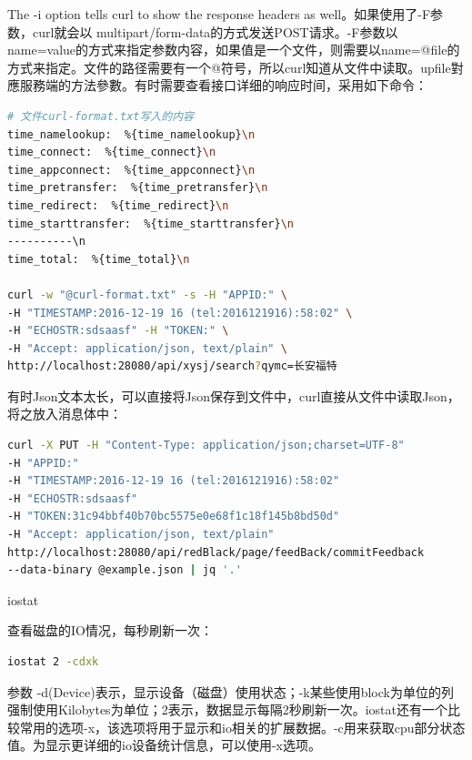 \documentclass[12pt]{book}
\makeatletter
\numberwithin{dummy}{section}
\theoremstyle{ocrenumbox}
\theoremstyle{blacknumex}
\theoremstyle{blacknumbox}
\theoremstyle{ocrenum}
\renewcommand{\subsection}{\@startsection {subsection}{2}{\z@}
	{-3ex \@plus -0.1ex \@minus -.4ex}
	{0.5ex \@plus.2ex }
	{\normalfont\sffamily\bfseries}}
\newlength\esp
\makeatother
\begin{document}
The -i option tells curl to show the response headers as well。如果使用了-F参数，curl就会以 multipart/form-data的方式发送POST请求。-F参数以name=value的方式来指定参数内容，如果值是一个文件，则需要以name=@file的方式来指定。文件的路径需要有一个@符号，所以curl知道从文件中读取。upfile對應服務端的方法參數。有时需要查看接口详细的响应时间，采用如下命令：

\begin{lstlisting}[language=Bash]
# 文件curl-format.txt写入的内容
time_namelookup:  %{time_namelookup}\n
time_connect:  %{time_connect}\n
time_appconnect:  %{time_appconnect}\n
time_pretransfer:  %{time_pretransfer}\n
time_redirect:  %{time_redirect}\n
time_starttransfer:  %{time_starttransfer}\n
----------\n
time_total:  %{time_total}\n

curl -w "@curl-format.txt" -s -H "APPID:" \
-H "TIMESTAMP:2016-12-19 16 (tel:2016121916):58:02" \
-H "ECHOSTR:sdsaasf" -H "TOKEN:" \
-H "Accept: application/json, text/plain" \
http://localhost:28080/api/xysj/search?qymc=长安福特
\end{lstlisting}

有时Json文本太长，可以直接将Json保存到文件中，curl直接从文件中读取Json，将之放入消息体中：

\begin{lstlisting}[language=Bash]
curl -X PUT -H "Content-Type: application/json;charset=UTF-8" 
-H "APPID:"  
-H "TIMESTAMP:2016-12-19 16 (tel:2016121916):58:02"  
-H "ECHOSTR:sdsaasf" 
-H "TOKEN:31c94bbf40b70bc5575e0e68f1c18f145b8bd50d"  
-H "Accept: application/json, text/plain" 
http://localhost:28080/api/redBlack/page/feedBack/commitFeedback 
--data-binary @example.json | jq '.'
\end{lstlisting}




\subsection{iostat}

查看磁盘的IO情况，每秒刷新一次：

\begin{lstlisting}[language=Bash]
iostat 2 -cdxk
\end{lstlisting}

参数 -d(Device)表示，显示设备（磁盘）使用状态；-k某些使用block为单位的列强制使用Kilobytes为单位；2表示，数据显示每隔2秒刷新一次。iostat还有一个比较常用的选项-x，该选项将用于显示和io相关的扩展数据。-c用来获取cpu部分状态值。为显示更详细的io设备统计信息，可以使用-x选项。
\end{document}
